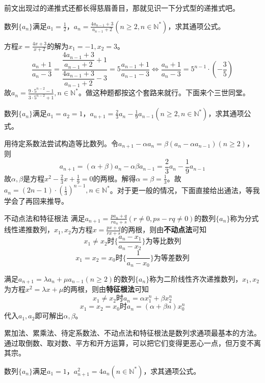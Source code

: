 \documentclass[../sample]{subfiles}
\begin{document}
前文出现过的递推式还都长得慈眉善目，那就见识一下分式型的递推式吧。

\begin{problem}
  数列$\{a_n\}$满足$a_1=\frac{1}{2}$，$a_n=\frac{4a_{n-1}+3}{a_{n-1}+2}(n\geq 2,n\in\mathbb{N^*})$，求其通项公式。
\end{problem}

方程$x=\frac{4x+3}{x+2}$的解为$x_1=-1, x_2=3$。
\[\frac{a_n+1}{a_n-3}=\frac{\dfrac{4a_{n-1}+3}{a_{n-1}+2}+1}{\dfrac{4a_{n-1}+3}{a_{n-1}+2}-3}=5\frac{a_{n-1}+1}{a_{n-1}-3}\Leftrightarrow \frac{a_n+1}{a_n-3}=5^{n-1}·(-\frac{3}{5})\]
故$a_n=\frac{9·5^{n-2}-1}{3·5^{n-2}+1},n\in\mathbb{N^*}$。做这种题都按这个套路来就行。下面来个三世同堂。

\begin{problem}
  数列$\{a_n\}$满足$a_1=a_2=1$，$a_{n+1}=\frac{2}{3}a_n-\frac{1}{9}a_{n-1}(n\geq 2,n\in\mathbb{N^*})$，求其通项公式。
\end{problem}

用待定系数法尝试构造等比数列。令$a_{n+1}-\alpha a_n=\beta (a_n-\alpha a_{n-1})(n\geq 2)$，则\[a_{n+1}=(\alpha+\beta)a_n-\alpha\beta a_{n-1}=\frac{2}{3}a_n-\frac{1}{9}a_{n-1}\]
故$\alpha, \beta$是方程$x^2-\frac{2}{3}x+\frac{1}{9}=0$的两根。解得$\alpha=\beta=\frac{1}{3}$。故$a_n=(2n-1)·(\frac{1}{3})^{n-1},n\in\mathbb{N^*}$。对于更一般的情况，下面直接给出通法，等我学会了再回来推导。

\begin{theorem}{不动点法和特征根法}
  满足$a_{n+1}=\frac{pa_n+q}{ra_n+s}(r\neq 0, ps-rq\neq 0)$的数列$\{a_n\}$称为分式线性递推数列，$x_1, x_2$为方程$x=\frac{px+q}{rx+s}$的两根，则由\textbf{不动点法}可知
  \[x_1\neq x_2时\{\frac{a_n-x_1}{a_n-x_2}\}为等比数列\]
  \[x_1=x_2=x_0时\{\frac{1}{a_n-x_0}\}为等差数列\]

  满足$a_{n+1}=\lambda a_n+\mu a_{n-1}(n\geq 2)$的数列$\{a_n\}$称为二阶线性齐次递推数列，$x_1, x_2$为方程$x^2=\lambda x+\mu$的两根，则由\textbf{特征根法}可知
  \[x_1\neq x_2时a_n=\alpha x_1^{n}+\beta x_2^{n}\]
  \[x_1=x_2=x_0时a_n=(\alpha+\beta n)x_0^{n}\]
  代入$a_1, a_2$即可解出$\alpha, \beta$。
\end{theorem}

累加法、累乘法、待定系数法、不动点法和特征根法是数列求通项最基本的方法。通过取倒数、取对数、平方和开方运算，可以把它们变得更恶心一点，但万变不离其宗。

\begin{problem}
  数列$\{a_n\}$满足$a_1=1$，$a_{n+1}^2=4a_n(n\in\mathbb{N^*})$，求其通项公式。
\end{problem}
\end{document}
